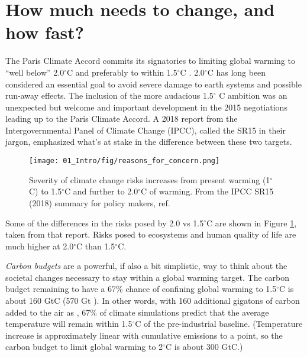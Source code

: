 
\section{How much needs to change, and how fast?}

The Paris Climate Accord commits its signatories to limiting global warming to ``well below'' 2.0$^\circ$C and preferably to within 1.5$^\circ$C \cite{UnitedNations2015}. 2.0$^\circ$C has long been considered an essential goal to avoid severe damage to earth systems and possible run-away effects\cite{Meinshausen2009, Allen2009, IPCC2014}. The inclusion of the more audacious 1.5$^\circ$ C ambition was an unexpected but welcome and important development in the 2015 negotiations leading up to the Paris Climate Accord. A 2018 report from the Intergovernmental Panel of Climate Change (IPCC), called the SR15 in their jargon, emphasized what's at stake in the difference between these two targets\cite{IPCC2018_SPM}. 
\begin{figure}[h!]
	\centering
	\texttt{[image: 01\_Intro/fig/reasons\_for\_concern.png]}
	\caption{Severity of climate change risks increases from present warming (1$^\circ$C) to 1.5$^\circ$C and further to 2.0$^\circ$C of warming. From the IPCC SR15 (2018) summary for policy makers, ref. \cite{IPCC2018_SPM}}
	\label{fig:RFC}
\end{figure}
Some of the differences in the risks posed by 2.0 vs 1.5$^\circ$C are shown in Figure \ref{fig:RFC}, taken from that report. Risks posed to ecosystems and human quality of life are much higher at 2.0$^\circ$C than 1.5$^\circ$C.

\textit{Carbon budgets} are a powerful, if also a bit simplistic\cite{Peters2018}, way to think about the societal changes necessary to stay within a global warming target. The carbon budget remaining to have a 67\% chance of confining global warming to 1.5$^\circ$C is about 160 GtC (570 Gt )\cite{IPCC2018_ch2}. In other words, with 160 additional gigatons of carbon added to the air as , 67\% of climate simulations predict that the average temperature will remain within 1.5$^\circ$C of the pre-industrial baseline. (Temperature increase is approximately linear with cumulative  emissions to a point\cite{IPCC2018_ch2}, so the carbon budget to limit global warming to 2$^\circ$C is about 300 GtC.)

